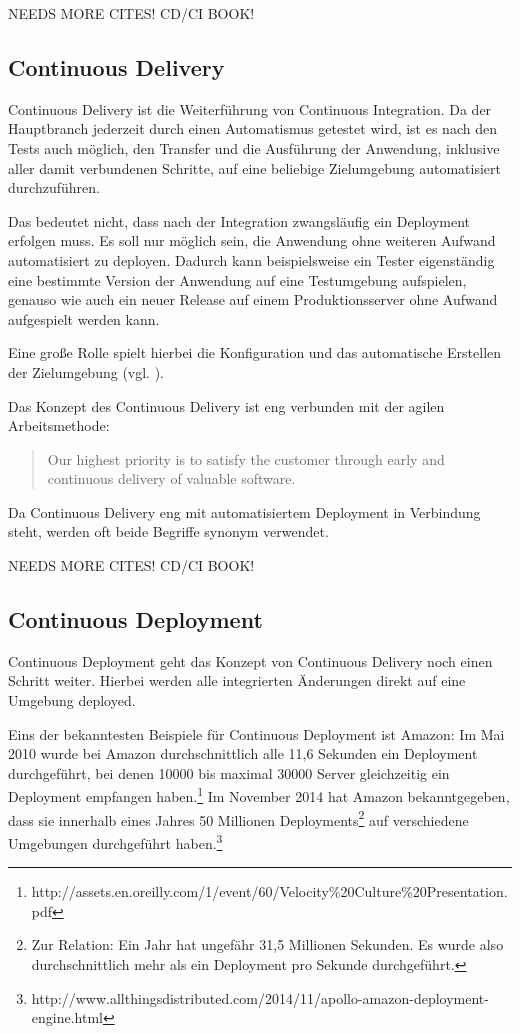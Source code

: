 {\draft NEEDS MORE CITES! CD/CI BOOK!}

\subsection{Continuous Delivery}

Continuous Delivery ist die Weiterführung von Continuous Integration. Da der Hauptbranch jederzeit durch einen Automatismus getestet wird, ist es nach den Tests auch möglich, den Transfer und die Ausführung der Anwendung, inklusive aller damit verbundenen Schritte, auf eine beliebige Zielumgebung automatisiert durchzuführen.

Das bedeutet nicht, dass nach der Integration zwangsläufig ein Deployment erfolgen muss. Es soll nur möglich sein, die Anwendung ohne weiteren Aufwand automatisiert zu deployen. Dadurch kann beispielsweise ein Tester eigenständig eine bestimmte Version der Anwendung auf eine Testumgebung aufspielen, genauso wie auch ein neuer Release auf einem Produktionsserver ohne Aufwand aufgespielt werden kann.

Eine große Rolle spielt hierbei die Konfiguration und das automatische Erstellen der Zielumgebung (vgl. ).

Das Konzept des Continuous Delivery ist eng verbunden mit der agilen Arbeitsmethode:

\begin{quote}
  Our highest priority is to satisfy the customer through early and continuous delivery of valuable software.
\end{quote}

Da Continuous Delivery eng mit automatisiertem Deployment in Verbindung steht, werden oft beide Begriffe synonym verwendet.

{\draft NEEDS MORE CITES! CD/CI BOOK!}


\subsection{Continuous Deployment}

Continuous Deployment geht das Konzept von Continuous Delivery noch einen Schritt weiter. Hierbei werden alle integrierten Änderungen direkt auf eine Umgebung deployed.

Eins der bekanntesten Beispiele für Continuous Deployment ist Amazon: Im Mai 2010 wurde bei Amazon durchschnittlich alle 11,6 Sekunden ein Deployment durchgeführt, bei denen 10000 bis maximal 30000 Server gleichzeitig ein Deployment empfangen haben.\footnote{http://assets.en.oreilly.com/1/event/60/Velocity\%20Culture\%20Presentation.pdf} Im November 2014 hat Amazon bekanntgegeben, dass sie innerhalb eines Jahres 50 Millionen Deployments\footnote{Zur Relation: Ein Jahr hat ungefähr 31,5 Millionen Sekunden. Es wurde also durchschnittlich mehr als ein Deployment pro Sekunde durchgeführt.} auf verschiedene Umgebungen durchgeführt haben.\footnote{http://www.allthingsdistributed.com/2014/11/apollo-amazon-deployment-engine.html}

